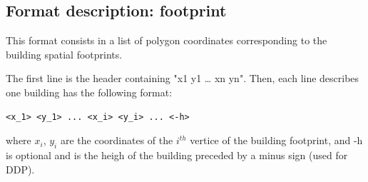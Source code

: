 \subsection{Format description: footprint}
This format consists in a list of polygon coordinates corresponding to the building spatial footprints.

The first line is the header containing "x1 y1 … xn yn".
Then, each line describes one building has the following format:
\begin{lstlisting}
<x_1> <y_1> ... <x_i> <y_i> ... <-h> \end{lstlisting}
where $x_i$, $y_i$ are the coordinates of the $i^{th}$ vertice of the building footprint, and -h is optional and is the heigh of the building preceded by a minus sign (used for DDP).
